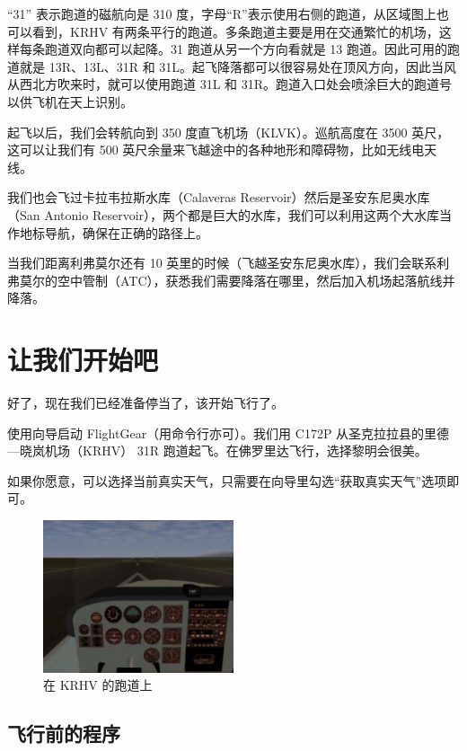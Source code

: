 “31” 表示跑道的磁航向是 310 度，字母“R”表示使用右侧的跑道，从区域图上也可以看到，KRHV 有两条平行的跑道。多条跑道主要是用在交通繁忙的机场，这样每条跑道双向都可以起降。31 跑道从另一个方向看就是 13 跑道。因此可用的跑道就是 13R、13L、31R 和 31L。起飞降落都可以很容易处在顶风方向，因此当风从西北方吹来时，就可以使用跑道 31L 和 31R。跑道入口处会喷涂巨大的跑道号以供飞机在天上识别。

起飞以后，我们会转航向到 350 度直飞机场（KLVK）。巡航高度在 3500 英尺，这可以让我们有 500 英尺余量来飞越途中的各种地形和障碍物，比如无线电天线。

我们也会飞过卡拉韦拉斯水库（Calaveras Reservoir）然后是圣安东尼奥水库（San Antonio Reservoir），两个都是巨大的水库，我们可以利用这两个大水库当作地标导航，确保在正确的路径上。

当我们距离利弗莫尔还有 10 英里的时候（飞越圣安东尼奥水库），我们会联系利弗莫尔的空中管制（ATC），获悉我们需要降落在哪里，然后加入机场起落航线并降落。

\section{让我们开始吧}

好了，现在我们已经准备停当了，该开始飞行了。

使用向导启动 FlightGear（用命令行亦可）。我们用 C172P 从圣克拉拉县的里德—晓岚机场（KRHV） 31R 跑道起飞。在佛罗里达飞行，选择黎明会很美。

如果你愿意，可以选择当前真实天气，只需要在向导里勾选“获取真实天气”选项即可。

\begin{figure}[!htp]
\centering
\includegraphics[width=0.5\textwidth]{krhvrunway}
\caption{在 KRHV 的跑道上}
\end{figure}

\subsection{飞行前的程序}

